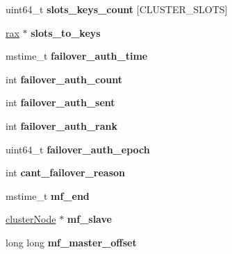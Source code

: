 \begin{DoxyCompactItemize}
\mbox{\label{structclusterState_ae85ad11c2ebc8a680883bf2e14a930d8}} 
uint64\+\_\+t {\bfseries slots\+\_\+keys\+\_\+count} \mbox{[}C\+L\+U\+S\+T\+E\+R\+\_\+\+S\+L\+O\+TS\mbox{]}
\item 
\mbox{\label{structclusterState_a75096139a10c1d93a9aa39e0127767c6}} 
\hyperlink{structrax}{rax} $\ast$ {\bfseries slots\+\_\+to\+\_\+keys}
\item 
\mbox{\label{structclusterState_ae4ecf61e881a8d51e08b0737c3ced2dc}} 
mstime\+\_\+t {\bfseries failover\+\_\+auth\+\_\+time}
\item 
\mbox{\label{structclusterState_a680bfceed44d08476cabfb4ff69e406c}} 
int {\bfseries failover\+\_\+auth\+\_\+count}
\item 
\mbox{\label{structclusterState_a3b6d9abb6c5bd0cd96ebf8478d9dacdd}} 
int {\bfseries failover\+\_\+auth\+\_\+sent}
\item 
\mbox{\label{structclusterState_a04b0fcfbf51ba160dfaa92e3009b8cb1}} 
int {\bfseries failover\+\_\+auth\+\_\+rank}
\item 
\mbox{\label{structclusterState_a0b155aa7170d100f391bceb01660813d}} 
uint64\+\_\+t {\bfseries failover\+\_\+auth\+\_\+epoch}
\item 
\mbox{\label{structclusterState_a1a1d4314d9283a63d2c9167d6560f130}} 
int {\bfseries cant\+\_\+failover\+\_\+reason}
\item 
\mbox{\label{structclusterState_af3ea36bbd489586bc9fcd1a006657f72}} 
mstime\+\_\+t {\bfseries mf\+\_\+end}
\item 
\mbox{\label{structclusterState_aa5e779b422ba935a084af8242ee7526a}} 
\hyperlink{structclusterNode}{cluster\+Node} $\ast$ {\bfseries mf\+\_\+slave}
\item 
\mbox{\label{structclusterState_ad5b4da4752c6da732602b3dd858a9977}} 
long long {\bfseries mf\+\_\+master\+\_\+offset}
\item 

\end{DoxyCompactItemize}
